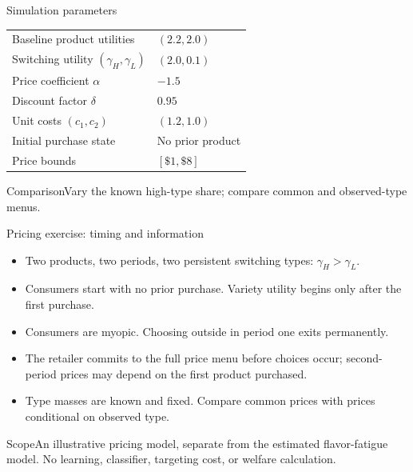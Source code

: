 \documentclass[aspectratio=169,11pt]{beamer}
\begin{document}
\begin{frame}[noframenumbering,label=supply-parameters]{Simulation parameters}
\centering\begin{tabular}{ll}\toprule
Baseline product utilities & $(2.2,2.0)$\\
Switching utility $(\gamma_H,\gamma_L)$ & $(2.0,0.1)$\\
Price coefficient $\alpha$ & $-1.5$\\
Discount factor $\delta$ & $0.95$\\
Unit costs $(c_1,c_2)$ & $(1.2,1.0)$\\
Initial purchase state & No prior product\\
Price bounds & $[\$1,\$8]$\\\bottomrule\end{tabular}
\begin{block}{Comparison}Vary the known high-type share; compare common and observed-type menus.\end{block}
\par\smallskip
\hyperlink{supply-results}{}
\end{frame}


\begin{frame}[noframenumbering,label=pricing-details]{Pricing exercise: timing and information}
\begin{itemize}
\item Two products, two periods, two persistent switching types: $\gamma_H>\gamma_L$.
\item Consumers start with \alert{no prior purchase}. Variety utility begins only after the first purchase.
\item Consumers are myopic. Choosing outside in period one exits permanently.
\item The retailer commits to the full price menu before choices occur; second-period prices may depend on the first product purchased.
\item Type masses are known and fixed. Compare common prices with prices conditional on observed type.
\end{itemize}
\begin{block}{Scope}An illustrative pricing model, separate from the estimated flavor-fatigue model. No learning, classifier, targeting cost, or welfare calculation.\end{block}
\par\hyperlink{pricing-setup}{}
\end{frame}
\end{document}
